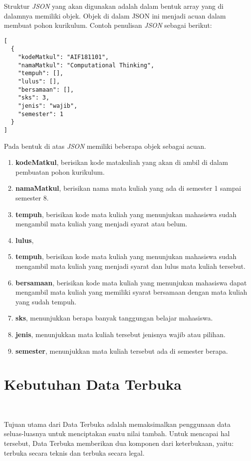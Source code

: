 Struktur \textit{JSON} yang akan digunakan adalah dalam bentuk array yang di dalamnya memiliki objek.  
Objek di dalam JSON ini menjadi acuan dalam membuat pohon kurikulum. Contoh penulisan \textit{JSON} sebagai berikut:

\begin{lstlisting}
[
  {
    "kodeMatkul": "AIF181101",
    "namaMatkul": "Computational Thinking",
    "tempuh": [],
    "lulus": [],
    "bersamaan": [],
    "sks": 3,
    "jenis": "wajib",
    "semester": 1
  }
]
\end{lstlisting}

Pada bentuk di atas \textit{JSON} memiliki beberapa objek sebagai acuan.
\begin{enumerate}
\item \textbf{kodeMatkul}, berisikan kode matakuliah yang akan di ambil di dalam pembuatan pohon kurikulum.
\item \textbf{namaMatkul}, berisikan nama mata kuliah yang ada di semester 1 sampai semester 8.
\item \textbf{tempuh}, berisikan kode mata kuliah yang menunjukan mahasiswa sudah mengambil mata kuliah yang menjadi syarat atau belum. 
\item \textbf{lulus}, \item \textbf{tempuh}, berisikan kode mata kuliah yang menunjukan mahasiswa sudah mengambil mata kuliah yang menjadi syarat dan lulus mata kuliah tersebut.
\item \textbf{bersamaan}, berisikan kode mata kuliah yang menunjukan mahasiswa dapat mengambil mata kuliah yang memiliki syarat bersamaan dengan mata kuliah yang sudah tempuh.
\item \textbf{sks}, menunjukkan berapa banyak tanggungan belajar mahasiswa.
\item \textbf{jenis}, menunjukkan mata kuliah tersebut jenisnya wajib atau pilihan.
\item \textbf{semester}, menunjukkan mata kuliah tersebut ada di semester berapa.
\end{enumerate}

\section{Kebutuhan Data Terbuka}
\label{sec: Kebutuhan Data Terbuka}
~\cite{creativecommons:06:lisensi}

Tujuan utama dari Data Terbuka adalah memaksimalkan penggunaan data seluas-luasnya untuk menciptakan suatu nilai tambah. Untuk mencapai hal tersebut, Data Terbuka memberikan dua komponen dari keterbukaan, yaitu: terbuka secara teknis dan terbuka secara legal. 

